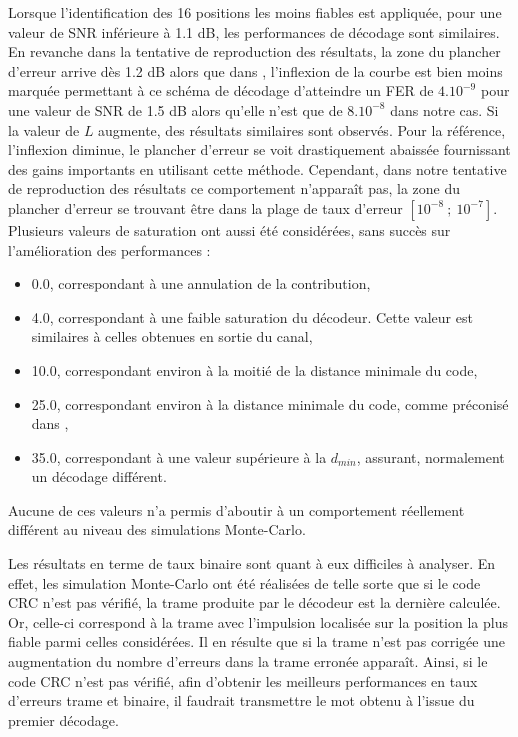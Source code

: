 Lorsque l'identification des 16 positions les moins fiables est appliquée, pour une valeur de SNR inférieure à 1.1 dB, les 
performances de décodage sont similaires. En revanche dans la tentative de reproduction des résultats, la zone du plancher
d'erreur arrive dès 1.2 dB alors que dans \cite{cim}, l'inflexion de la courbe est bien moins marquée permettant à ce 
schéma de décodage d'atteindre un FER de $4.10^{-9}$ pour une valeur de SNR de 1.5 dB alors qu'elle n'est que de $8.10^{-8}$
dans notre cas. Si la valeur de $L$ augmente, des résultats similaires sont observés. Pour la référence, 
l'inflexion diminue, le plancher d'erreur se voit drastiquement abaissée fournissant des gains importants en utilisant
cette méthode. Cependant, dans notre tentative de reproduction des résultats ce comportement n’apparaît pas, la zone du 
plancher d'erreur se trouvant être dans la plage de taux d'erreur $[10^{-8}~;~10^{-7}]$. Plusieurs valeurs de saturation 
ont aussi été considérées, sans succès sur l'amélioration des performances :
\begin{itemize}
	\item 0.0, correspondant à une annulation de la contribution, 
	\item 4.0, correspondant à une faible saturation du décodeur. Cette valeur est similaires à celles obtenues en sortie du canal,
	\item 10.0, correspondant environ à la moitié de la distance minimale du code,
	\item 25.0, correspondant environ à la distance minimale du code, comme préconisé dans \cite{cim, fsm},
	\item 35.0, correspondant à une valeur supérieure à la $d_{min}$, assurant, normalement un décodage différent.
\end{itemize}
Aucune de ces valeurs n'a permis d'aboutir à un comportement réellement différent au niveau des simulations Monte-Carlo.

Les résultats en terme de taux binaire sont quant à eux difficiles à analyser. En effet, les simulation Monte-Carlo 
ont été réalisées de telle sorte que si le code CRC n'est pas vérifié, la trame produite par le décodeur est la dernière calculée.
Or, celle-ci correspond à la trame avec l'impulsion localisée sur la position la plus fiable parmi celles considérées. 
Il en résulte que si la trame n'est pas corrigée une augmentation du nombre d'erreurs dans la trame erronée apparaît. Ainsi, 
si le code CRC n'est pas vérifié, afin d'obtenir les meilleurs performances en taux d'erreurs trame et binaire, il faudrait 
transmettre le mot obtenu à l'issue du premier décodage.

